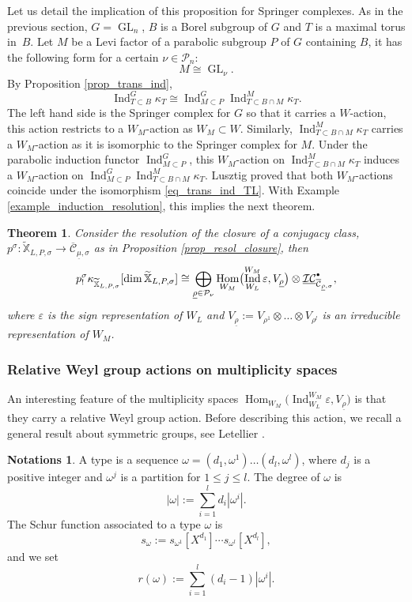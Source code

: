\documentclass[JEP,XML,SOM,NoEqCountersInSection,Unicode,published]{cedram}
\newcommand{\sbullet}{{\scriptscriptstyle\bullet}}
\newcommand{\csbullet}{{\raisebox{1pt}{$\sbullet$}}}
\let\epsilon\varepsilon
\theoremstyle{definition}
\newtheorem{notations}[definition]{Notations}
\theoremstyle{plain}
\newtheorem{theorem}[definition]{Theorem}
\DeclareMathOperator{\Hom}{Hom}
\DeclareMathOperator{\Ind}{Ind}
\DeclareMathOperator{\GL}{GL}
\newcommand{\Part}{\mathcal{P}}
\newcommand{\uic}[1]{\underline{\mathcal{I C}}_{#1}^{\csbullet}}
\begin{document}
Let us detail the implication of this proposition for Springer complexes. As in the previous section, $G=\GL_n$, $B$ is a Borel subgroup of $G$ and $T$ is a maximal torus in~$B$. Let $M$ be a Levi factor of a parabolic subgroup $P$ of $G$ containing $B$, it has the following form for a certain $\nu\in\Part_n$:
\[
M\cong \GL_{\nu}.
\]
By Proposition \ref{prop_trans_ind},
\begin{equation}\label{eq_trans_ind_TL}
\Ind_{T\subset B}^G\kappa_{T}\cong \Ind_{M\subset P}^G\Ind_{T\subset B\cap M}^M \kappa_{T}.
\end{equation}
The left hand side is the Springer complex for $G$ so that it carries a $W$-action, this action restricts to a $W_M$-action as $W_M\subset W$. Similarly, $\Ind_{T\subset B\cap M}^M \kappa_{T}$ carries a $W_M$\nobreakdash-action as it is isomorphic to
the Springer complex for $M$. Under the parabolic induction functor $\Ind_{M\subset P}^{G}$, this $W_M$-action on $\Ind_{T\subset B\cap M}^M \kappa_{T}$ induces a $W_M$-action on $\Ind_{M\subset P}^{G}\Ind_{T\subset B\cap M}^M \kappa_{T}$. Lusztig \cite[2.5]{Lusztig1986} proved that both $W_M$-actions coincide under the isomorphism \eqref{eq_trans_ind_TL}. With Example \ref{example_induction_resolution}, this implies the next theorem.
\begin{theorem}\label{th_parabolic_induction_constant}
Consider the resolution of the closure of a conjugacy class, ${p^{\sigma}}:{\mathbb{\widetilde{X}}_{L,P,\sigma}}\to{\overline{\mathcal{C}}_{\underline{\mu},\sigma}}$ as in Proposition \ref{prop_resol_closure}, then
\[
p_!^{\sigma} \kappa_{\mathbb{\widetilde{X}}_{L,P,\sigma}}[\dim \mathbb{\widetilde{X}}_{L,P,\sigma}] \cong \bigoplus_{\underline{\rho}\in\Part_{\nu}} \Hom_{W_M} \bigl(\Ind_{W_L}^{W_M} \epsilon, V_{\underline{\rho}}\bigr)\otimes \uic{\overline{\mathcal{C}}_{\underline{\rho},\sigma}},
\]
where $\epsilon$ is the sign representation of $W_L$ and $V_{\underline{\rho}}:=V_{\rho^1}\otimes\dots\otimes V_{\rho^l}$ is an irreducible representation of $W_M$.
\end{theorem}

\subsubsection{Relative Weyl group actions on multiplicity spaces}\label{subsect_relative_weyl_class}
An interesting feature of the multiplicity spaces $\Hom_{W_M} \bigl(\Ind_{W_L}^{W_M} \epsilon, V_{\underline{\rho}}\bigr)$ is that they carry a relative Weyl group action. Before describing this action, we recall a general result about symmetric groups, see Letellier \cite[6.1, 6.2]{Letellier_gl}.
\begin{notations}
A type is a sequence $\omega=(d_1,\omega^1)\dots(d_l,\omega^l)$, where $d_j$ is a positive integer and $\omega^j$ is a partition for $1\le j \le l$. The degree of $\omega$ is
\[
|\omega|:=\sum_{i=1}^l d_i |\omega^i|.
\]
The Schur function associated to a type $\omega$ is
\[
s_{\omega}:= s_{\omega^1}[X^{d_1}]\cdots s_{\omega^l}[X^{d_l}],
\]
and we set
\begin{equation}\label{eq_r_omega}
r(\omega):= \sum_{i=1}^l (d_i-1)|\omega^i|.
\end{equation}
\end{notations}
\end{document}
